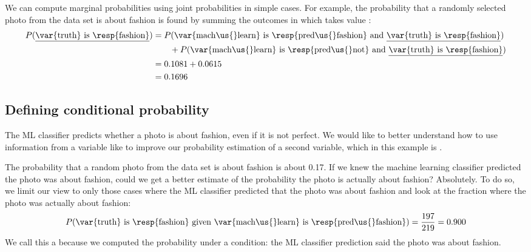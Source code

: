 \D{\newpage}

We can compute marginal probabilities using joint probabilities
in simple cases.
For example, the probability that a randomly selected photo from the
data set is about fashion is found by summing the outcomes in which  takes value :%
\newcommand{\ultruthfashion}[0]
    {\underline{\var{truth} is \resp{fashion}}}%
\begin{align*}
P(\text{\ultruthfashion{}})
  &= P(\text{\var{mach\us{}learn} is \resp{pred\us{}fashion}
        and \ultruthfashion{}}) \\
    & \qquad + P(\text{\var{mach\us{}learn} is \resp{pred\us{}not}
        and \ultruthfashion{}}) \\
  &= 0.1081 + 0.0615 \\
  &= 0.1696
\end{align*}


\subsection{Defining conditional probability}


The ML classifier predicts whether a photo is about fashion,
even if it is not perfect.
We would like to better understand how to use information
from a variable like  to improve our
probability estimation of a second variable, which in this
example is .

The probability that a random photo from the data set is about
fashion is about 0.17.
If we knew the machine learning classifier predicted the
photo was about fashion, could we get a better estimate of the
probability the photo is actually about fashion?
Absolutely.
To do so, we limit our view to only those \fashYA{} cases
where the ML classifier predicted that the photo was about
fashion and look at the fraction where the photo was actually
about fashion:
\begin{align*}
P(\text{\var{truth} is \resp{fashion} given
    \var{mach\us{}learn} is \resp{pred\us{}fashion}})
  = \frac{\fashYY{}}{\fashYA{}}
  = 0.900
\end{align*}
We call this a  because
we computed the probability under a condition:
the ML classifier prediction said the photo was about fashion.

